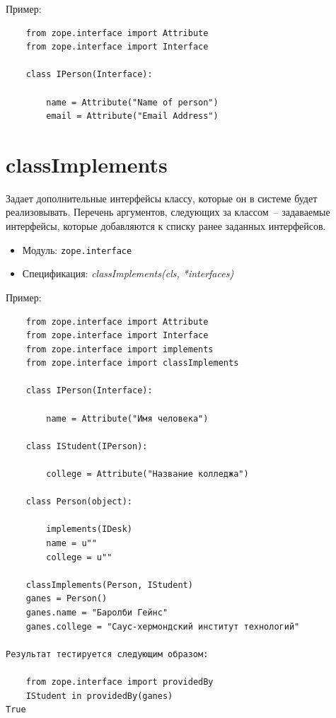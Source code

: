 \documentclass[a4paper,openany,twoside,final]{book}
\providecommand*{\DUroletitlereference}[1]{\textsl{#1}}
\begin{document}
Пример:

\begin{verbatim}
    from zope.interface import Attribute
    from zope.interface import Interface

    class IPerson(Interface):

        name = Attribute("Name of person")
        email = Attribute("Email Address")
\end{verbatim}


\section*{classImplements%
  \label{classimplements}%
}

Задает дополнительные интерфейсы классу, которые он в системе будет реализовывать.  Перечень аргументов, следующих за классом~-- задаваемые интерфейсы, которые добавляются к списку ранее заданных интерфейсов.

\begin{itemize}

\item Модуль: \texttt{zope.interface}

\item Спецификация: \DUroletitlereference{classImplements(cls, *interfaces)}

\end{itemize}

Пример:

\begin{verbatim}
    from zope.interface import Attribute
    from zope.interface import Interface
    from zope.interface import implements
    from zope.interface import classImplements

    class IPerson(Interface):

        name = Attribute("Имя человека")

    class IStudent(IPerson):

        college = Attribute("Название колледжа")

    class Person(object):

        implements(IDesk)
        name = u""
        college = u""

    classImplements(Person, IStudent)
    ganes = Person()
    ganes.name = "Баролби Гейнс"
    ganes.college = "Саус-хермондский институт технологий"

Результат тестируется следующим образом:

    from zope.interface import providedBy
    IStudent in providedBy(ganes)
True
\end{verbatim}
\end{document}
